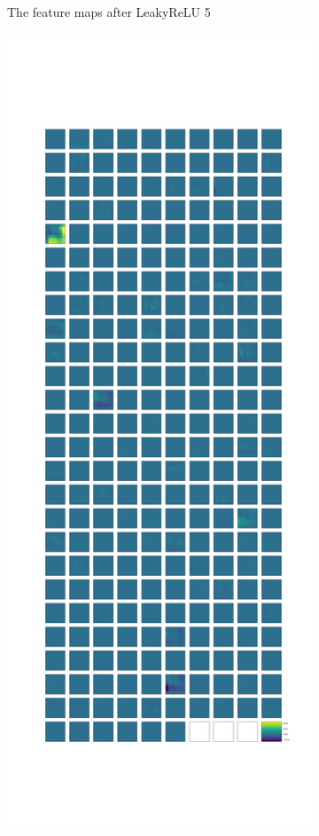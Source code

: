 \begin{figure}
\begin{subfigure}{0.3\textwidth}
        \caption{The feature maps after LeakyReLU 5}
        \label{subfig:lakyrelu5}
    \end{subfigure}
    \hfill
    \begin{subfigure}{0.3\textwidth}
        \centering
        \includegraphics[width=\textwidth]{images/stripes/max_pooling2d_3.png}

\end{subfigure}
\end{figure}
